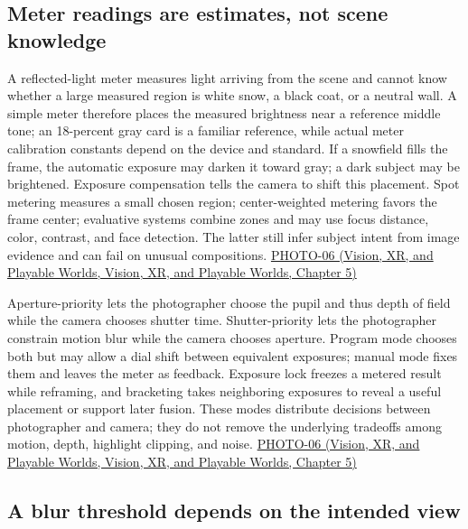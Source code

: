 \subsection{Meter readings are estimates, not scene knowledge}\label{03-visual-computing-i-ch003-meter-readings-are-estimates-not-scene-knowledge}

A reflected-light meter measures light arriving from the scene and cannot know whether a large measured region is white snow, a black coat, or a neutral wall. A simple meter therefore places the measured brightness near a reference middle tone; an 18-percent gray card is a familiar reference, while actual meter calibration constants depend on the device and standard. If a snowfield fills the frame, the automatic exposure may darken it toward gray; a dark subject may be brightened. Exposure compensation tells the camera to shift this placement. Spot metering measures a small chosen region; center-weighted metering favors the frame center; evaluative systems combine zones and may use focus distance, color, contrast, and face detection. The latter still infer subject intent from image evidence and can fail on unusual compositions. \href{../07-Vision-XR-and-Playable-Worlds/main.pdf\#nameddest=04-visual-computing-ii-ch036-photo-06---photography-session-06}{PHOTO-06 (Vision, XR, and Playable Worlds, Vision, XR, and Playable Worlds, Chapter 5)}

Aperture-priority lets the photographer choose the pupil and thus depth of field while the camera chooses shutter time. Shutter-priority lets the photographer constrain motion blur while the camera chooses aperture. Program mode chooses both but may allow a dial shift between equivalent exposures; manual mode fixes them and leaves the meter as feedback. Exposure lock freezes a metered result while reframing, and bracketing takes neighboring exposures to reveal a useful placement or support later fusion. These modes distribute decisions between photographer and camera; they do not remove the underlying tradeoffs among motion, depth, highlight clipping, and noise. \href{../07-Vision-XR-and-Playable-Worlds/main.pdf\#nameddest=04-visual-computing-ii-ch036-photo-06---photography-session-06}{PHOTO-06 (Vision, XR, and Playable Worlds, Vision, XR, and Playable Worlds, Chapter 5)}

\subsection{A blur threshold depends on the intended view}\label{03-visual-computing-i-ch003-a-blur-threshold-depends-on-the-intended-view}

